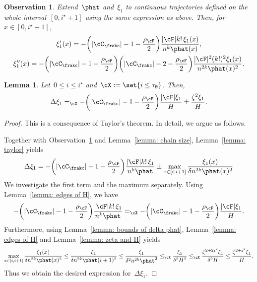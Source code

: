 \documentclass[11pt]{amsart}
\newcommand{\eps}{\varepsilon}
\DeclarePairedDelimiter{\paren}{\lparen}{\rparen}
\DeclarePairedDelimiter{\abs}{\lvert}{\rvert}
\newcommand{\Xleq}{\leq_{\cX}}
\newcommand{\Xeq}{=_{\cX}}
\newtheorem{lemma}[algocf]{Lemma}
\newtheorem{observation}[algocf]{Observation}
\theoremstyle{definition}
\numberwithin{equation}{section}
\begin{document}
	\begin{observation}\label{observation: xi chain}
		Extend~$\phat$ and~$\xi_1$ to continuous trajectories defined on the whole interval~$[0,i^\star+1]$ using the same expression as above.
		Then, for~$x\in[0,i^\star+1]$,
		\begin{equation*}
			\begin{gathered}
				\xi_1'(x)=-\paren[\bigg]{\abs{\cC_\frakc}-1-\frac{\rho_\cF}{2}}\frac{\abs{\cF}k!\,\xi_1(x)}{n^k\phat(x)},\\
				\xi_1''(x)=-\paren[\bigg]{\abs{\cC_\frakc}-1-\frac{\rho_\cF}{2}}\paren[\bigg]{\abs{\cC_\frakc}-2-\frac{\rho_\cF}{2}}\frac{\abs{\cF}^2(k!)^2\xi_1(x)}{n^{2k}\phat(x)^2}.
			\end{gathered}
		\end{equation*}
	\end{observation}
	
	\begin{lemma}\label{lemma: delta phihat G J xi ladder}
		Let~$0\leq i\leq i^\star$ and~$\cX:=\set{i\leq\tau_\emptyset}$.
		Then,
		\begin{equation*}
			\Delta\xi_1 \Xeq -\paren[\bigg]{\abs{\cC_\frakc}-1-\frac{\rho_{\cF}}{2}}\frac{\abs{\cF}\xi_1}{H}\pm \frac{\zeta^{2}\xi_1}{H}.
		\end{equation*}
	\end{lemma}
	\begin{proof}
		This is a consequence of Taylor's theorem.
		In detail, we argue as follows.
		
		Together with Observation~\ref{observation: xi chain} and Lemma~\ref{lemma: chain size}, Lemma~\ref{lemma: taylor} yields
		\begin{equation*}
			\Delta\xi_1 = -\paren[\bigg]{\abs{\cC_\frakc}-1-\frac{\rho_\cF}{2}}\frac{\abs{\cF}k!\,\xi_1}{n^k\phat}\pm \max_{x\in[i,i+1]}\frac{\xi_1(x)}{\delta n^{2k}\phat(x)^2}
		\end{equation*}
		We investigate the first term and the maximum separately.
		Using Lemma~\ref{lemma: edges of H}, we have
		\begin{equation*}
			-\paren[\bigg]{\abs{\cC_\frakc}-1-\frac{\rho_\cF}{2}}\frac{\abs{\cF}k!\,\xi_1}{n^k\phat}
			\Xeq-\paren[\bigg]{\abs{\cC_\frakc}-1-\frac{\rho_\cF}{2}}\frac{\abs{\cF}\xi_1}{H}.
		\end{equation*}
		Furthermore, using Lemma~\ref{lemma: bounds of delta phat}, Lemma~\ref{lemma: edges of H} and Lemma~\ref{lemma: zeta and H} yields
		\begin{equation*}
			\max_{x\in[i,i+1]}\frac{\xi_1(x)}{\delta n^{2k}\phat(x)^2}
			\leq \frac{\xi_1}{\delta n^{2k}\phat(i+1)^2}
			\leq \frac{\xi_1}{\delta^2 n^{2k}\phat^2}
			\Xleq \frac{\xi_1}{\delta^2 H^2}
			\Xleq \frac{\zeta^{2+2\eps^2}\xi_1}{\delta^2 H}
			\leq \frac{\zeta^{2+\eps^2}\xi_1}{H}.
		\end{equation*}
		Thus we obtain the desired expression for~$\Delta\xi_1$.
	\end{proof}
	
\end{document}

